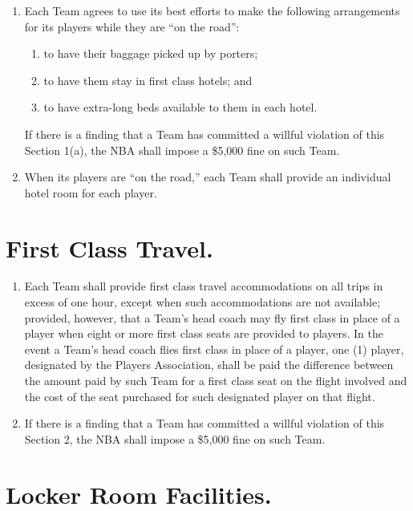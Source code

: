 \documentclass[
]{book}
\providecommand{\tightlist}{%
  \setlength{\itemsep}{0pt}\setlength{\parskip}{0pt}}
\begin{document}
\begin{enumerate}
\def\labelenumi{(\alph{enumi})}
\tightlist
\item
  Each Team agrees to use its best efforts to make the following arrangements for its players while they are ``on the road'':

  \begin{enumerate}
  \def\labelenumii{(\roman{enumii})}
  \tightlist
  \item
    to have their baggage picked up by porters;
  \item
    to have them stay in first class hotels; and
  \item
    to have extra-long beds available to them in each hotel.
  \end{enumerate}

  If there is a finding that a Team has committed a willful violation of this Section 1(a), the NBA shall impose a \$5,000 fine on such Team.
\item
  When its players are ``on the road,'' each Team shall provide an individual hotel room for each player.
\end{enumerate}

\hypertarget{first-class-travel.}{%
\section{First Class Travel.}\label{first-class-travel.}}

\begin{enumerate}
\def\labelenumi{(\alph{enumi})}
\tightlist
\item
  Each Team shall provide first class travel accommodations on all trips in excess of one hour, except when such accommodations are not available; provided, however, that a Team's head coach may fly first class in place of a player when eight or more first class seats are provided to players. In the event a Team's head coach flies first class in place of a player, one (1) player, designated by the Players Association, shall be paid the difference between the amount paid by such Team for a first class seat on the flight involved and the cost of the seat purchased for such designated player on that flight.
\item
  If there is a finding that a Team has committed a willful violation of this Section 2, the NBA shall impose a \$5,000 fine on such Team.
\end{enumerate}

\hypertarget{locker-room-facilities.}{%
\section{Locker Room Facilities.}\label{locker-room-facilities.}}
\end{document}
